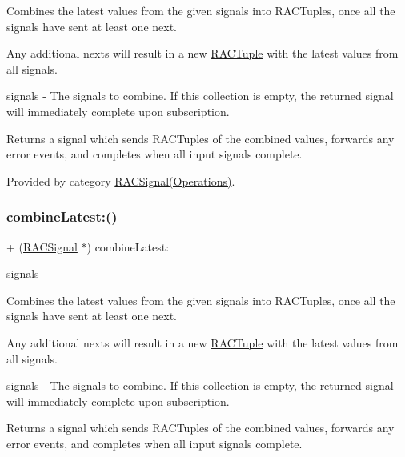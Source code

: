 Combines the latest values from the given signals into R\+A\+C\+Tuples, once all the signals have sent at least one {\ttfamily next}.

Any additional {\ttfamily next}s will result in a new \mbox{\hyperlink{interface_r_a_c_tuple}{R\+A\+C\+Tuple}} with the latest values from all signals.

signals -\/ The signals to combine. If this collection is empty, the returned signal will immediately complete upon subscription.

Returns a signal which sends R\+A\+C\+Tuples of the combined values, forwards any {\ttfamily error} events, and completes when all input signals complete. 

Provided by category \mbox{\hyperlink{category_r_a_c_signal_07_operations_08_a8a7a563a48665fb1203e2b37db6e5e98}{R\+A\+C\+Signal(\+Operations)}}.

\mbox{\label{interface_r_a_c_signal_a8a7a563a48665fb1203e2b37db6e5e98}} 
\subsubsection{\texorpdfstring{combine\+Latest\+:()}{combineLatest:()}\hspace{0.1cm}{\footnotesize\ttfamily [3/3]}}
{\footnotesize\ttfamily + (\mbox{\hyperlink{interface_r_a_c_signal}{R\+A\+C\+Signal}} $\ast$) combine\+Latest\+: \begin{DoxyParamCaption}\item[{(id$<$ N\+S\+Fast\+Enumeration $>$)}]{signals }\end{DoxyParamCaption}}

Combines the latest values from the given signals into R\+A\+C\+Tuples, once all the signals have sent at least one {\ttfamily next}.

Any additional {\ttfamily next}s will result in a new \mbox{\hyperlink{interface_r_a_c_tuple}{R\+A\+C\+Tuple}} with the latest values from all signals.

signals -\/ The signals to combine. If this collection is empty, the returned signal will immediately complete upon subscription.

Returns a signal which sends R\+A\+C\+Tuples of the combined values, forwards any {\ttfamily error} events, and completes when all input signals complete. 

